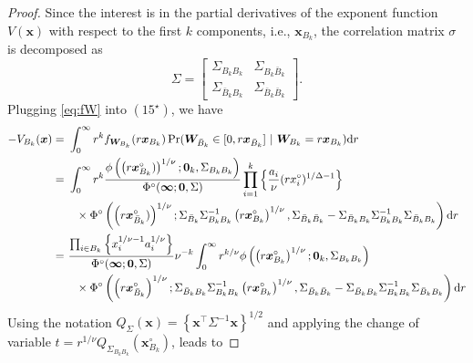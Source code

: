 \documentclass[12pt]{article}
\begin{document}
\begin{proof}
Since the interest is in the partial derivatives of the exponent function $V(\bm x)$ with respect to the first $k$ components, i.e.,  $\bm x_{B_k}$, the correlation matrix $\sigma$ is decomposed as
$$\Sigma = \begin{bmatrix}
 \Sigma_{B_k B_k} &  \Sigma_{B_k \bar{B}_k} \\
  \Sigma_{\bar{B}_k B_k} &  \Sigma_{\bar{B}_k \bar{B}_k}	
 \end{bmatrix}.
$$
Plugging \eqref{eq:fW} into $(15^\star)$, we have
%
\begin{align*}
 -V_{B_k}(\bm x) =&\ \int_0^\infty r^k f_{\bm W_{B_k}}(r \bm x_{B_k})  \Pr(\bm W_{\bar{B}_k} \in [0, r \bm x_{\bar{B}_k} ]\ | \ \bm W_{B_k} = r \bm x_{B_k} )\text dr \\
=&\ \int_0^\infty r^k \frac{\phi\left( \left( r \bm x_{B_k}^\circ) \right)^{1/\nu}; \bm 0_{k}, \Sigma_{B_k B_k}\right)}{\Phi^\circ(\bm \infty;\bm 0, \Sigma)} 
\prod_{i=1}^k \left\{ \frac{a_i}{\nu}(r x_i^\circ)^{1/\Delta-1} \right\} \\
&\quad \times \Phi^\circ \left( \left(r \bm x_{\bar{B}_k}^\circ)\right)^{1/\nu};
\Sigma_{\bar{B}_k}\Sigma_{B_k B_k}^{-1} \left(r \bm x_{B_k}^\circ\right)^{1/\nu},\Sigma_{\bar{B}_k\bar{B}_k}-\Sigma_{\bar{B}_k B_k}\Sigma_{B_k B_k}^{-1}\Sigma_{\bar{B}_k B_k} \right)  \text dr \\
=&\ \frac{\prod_{i\in B_k} \left\{ x_i^{1/\nu-1}a_i^{1/\nu}\right\}}{\Phi^\circ(\bm \infty;\bm 0, \Sigma)} \nu^{-k} \int_0^\infty r^{k/\nu} \phi\left( \left( r \bm x_{B_k}^\circ\right)^{1/\nu}; \bm 0_k, \Sigma_{B_k B_k}\right) \\
&\quad \times \Phi^\circ \left( \left(r \bm x_{\bar{B}_k}^\circ \right)^{1/\nu};
\Sigma_{\bar{B}_k B_k}\Sigma_{B_k B_k}^{-1} \left(r \bm x_{B_k}^\circ\right)^{1/\nu},\Sigma_{\bar{B}_k \bar{B}_k}-\Sigma_{\bar{B}_k B_k}\Sigma_{B_k B_k}^{-1}\Sigma_{\bar{B}_k B_k}\right) \text dr\\
\end{align*} 
%
Using the notation $Q_\Sigma \left( \bm x \right) = \left\{ \bm x^\top \Sigma^{-1} \bm x\right\}^{1/2}$ and applying the change of variable $t=r^{1/\nu}Q_{\Sigma_{B_k B_k}}(\bm x_{B_k}^\circ)$, leads to 


\end{proof}
\end{document}
